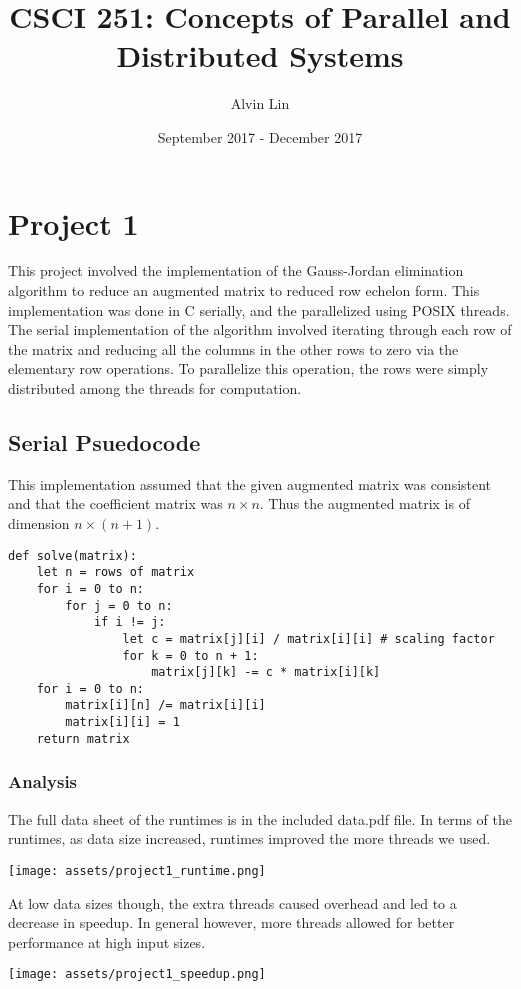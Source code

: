 \documentclass{math}
\title{CSCI 251: Concepts of Parallel and Distributed Systems}
\author{Alvin Lin}
\date{September 2017 - December 2017}
\begin{document}
\maketitle

\section*{Project 1}
This project involved the implementation of the Gauss-Jordan elimination
algorithm to reduce an augmented matrix to reduced row echelon form. This
implementation was done in C serially, and the parallelized using POSIX threads.
The serial implementation of the algorithm involved iterating through each
row of the matrix and reducing all the columns in the other rows to zero via
the elementary row operations. To parallelize this operation, the rows were
simply distributed among the threads for computation.

\subsection*{Serial Psuedocode}
This implementation assumed that the given augmented matrix was consistent
and that the coefficient matrix was \( n\times n \). Thus the augmented matrix
is of dimension \( n\times (n+1) \).
\begin{lstlisting}
def solve(matrix):
    let n = rows of matrix
    for i = 0 to n:
        for j = 0 to n:
            if i != j:
                let c = matrix[j][i] / matrix[i][i] # scaling factor
                for k = 0 to n + 1:
                    matrix[j][k] -= c * matrix[i][k]
    for i = 0 to n:
        matrix[i][n] /= matrix[i][i]
        matrix[i][i] = 1
    return matrix
\end{lstlisting}

\subsubsection*{Analysis}
The full data sheet of the runtimes is in the included data.pdf file.
In terms of the runtimes, as data size increased, runtimes improved the more
threads we used.
\begin{center}
  \texttt{[image: assets/project1\_runtime.png]}
\end{center}
At low data sizes though, the extra threads caused overhead and led to a
decrease in speedup. In general however, more threads allowed for better
performance at high input sizes.
\begin{center}
  \texttt{[image: assets/project1\_speedup.png]}
\end{center}
\end{document}
